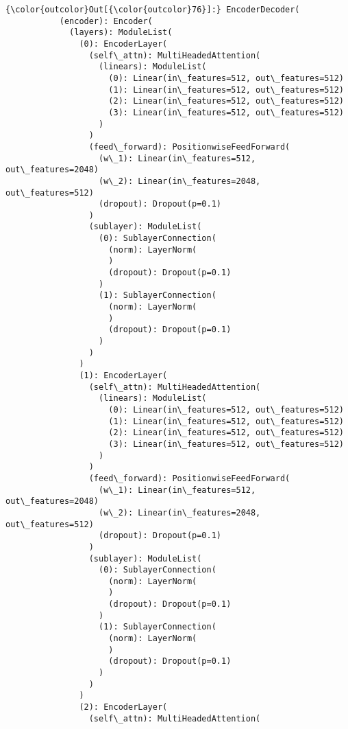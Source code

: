 \documentclass[11pt]{article}
\begin{document}
\begin{Verbatim}[commandchars=\\\{\}]
{\color{outcolor}Out[{\color{outcolor}76}]:} EncoderDecoder(
           (encoder): Encoder(
             (layers): ModuleList(
               (0): EncoderLayer(
                 (self\_attn): MultiHeadedAttention(
                   (linears): ModuleList(
                     (0): Linear(in\_features=512, out\_features=512)
                     (1): Linear(in\_features=512, out\_features=512)
                     (2): Linear(in\_features=512, out\_features=512)
                     (3): Linear(in\_features=512, out\_features=512)
                   )
                 )
                 (feed\_forward): PositionwiseFeedForward(
                   (w\_1): Linear(in\_features=512, out\_features=2048)
                   (w\_2): Linear(in\_features=2048, out\_features=512)
                   (dropout): Dropout(p=0.1)
                 )
                 (sublayer): ModuleList(
                   (0): SublayerConnection(
                     (norm): LayerNorm(
                     )
                     (dropout): Dropout(p=0.1)
                   )
                   (1): SublayerConnection(
                     (norm): LayerNorm(
                     )
                     (dropout): Dropout(p=0.1)
                   )
                 )
               )
               (1): EncoderLayer(
                 (self\_attn): MultiHeadedAttention(
                   (linears): ModuleList(
                     (0): Linear(in\_features=512, out\_features=512)
                     (1): Linear(in\_features=512, out\_features=512)
                     (2): Linear(in\_features=512, out\_features=512)
                     (3): Linear(in\_features=512, out\_features=512)
                   )
                 )
                 (feed\_forward): PositionwiseFeedForward(
                   (w\_1): Linear(in\_features=512, out\_features=2048)
                   (w\_2): Linear(in\_features=2048, out\_features=512)
                   (dropout): Dropout(p=0.1)
                 )
                 (sublayer): ModuleList(
                   (0): SublayerConnection(
                     (norm): LayerNorm(
                     )
                     (dropout): Dropout(p=0.1)
                   )
                   (1): SublayerConnection(
                     (norm): LayerNorm(
                     )
                     (dropout): Dropout(p=0.1)
                   )
                 )
               )
               (2): EncoderLayer(
                 (self\_attn): MultiHeadedAttention(

\end{Verbatim}
\end{document}
